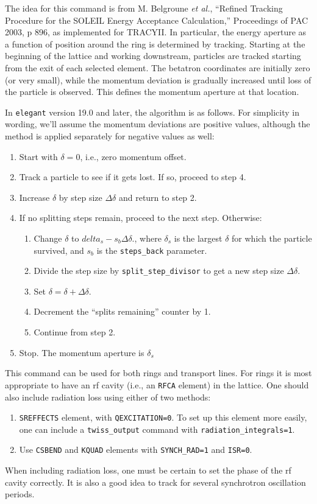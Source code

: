 \documentclass[11pt]{article}
\begin{document}
The idea for this command is from M. Belgroune {\em et al.}, ``Refined
Tracking Procedure for the SOLEIL Energy Acceptance Calculation,''
Proceedings of PAC 2003, p 896, as implemented for TRACYII.  In
particular, the energy aperture as a function of position around the
ring is determined by tracking.  Starting at the beginning of the
lattice and working downstream, particles are tracked starting from
the exit of each selected element.  The betatron coordinates are
initially zero (or very small), while the momentum deviation is
gradually increased until loss of the particle is observed.  This
defines the momentum aperture at that location.

In {\tt elegant} version 19.0 and later, the algorithm is as follows.  For simplicity in
wording, we'll assume the momentum deviations are positive values,
although the method is applied separately for negative values as well:
\begin{enumerate}
\item Start with $\delta=0$, i.e., zero momentum offset.
\item Track a particle to see if it gets lost.  If so, proceed to step 4.
\item Increase $\delta$ by step size $\Delta\delta$ and return to step 2.
\item If no splitting steps remain, proceed to the next step.  Otherwise:
\begin{enumerate}
\item Change $\delta$ to $delta_s - s_b\Delta\delta$., where $\delta_s$ is
 the largest $\delta$ for which the particle survived, and $s_b$ is the
 \verb|steps_back| parameter.
\item Divide the step size by \verb|split_step_divisor| to get a new step size  $\Delta\delta$.
\item Set $\delta = \delta + \Delta\delta$.
\item Decrement the ``splits remaining'' counter by 1.
\item Continue from step 2.
\end{enumerate}
\item Stop.  The momentum aperture is $\delta_s$
\end{enumerate}

This command can be used for both rings and transport lines.  For
rings it is most appropriate to have an rf cavity (i.e., an {\tt RFCA}
element) in the lattice.  One should also include radiation loss using
either of two methods:
\begin{enumerate}
\item {\tt SREFFECTS} element, with {\tt QEXCITATION=0}.  To set up this element more easily, one
 can include a \verb|twiss_output| command with \verb|radiation_integrals=1|.
\item Use {\tt CSBEND} and {\tt KQUAD} elements with \verb|SYNCH_RAD=1| and \verb|ISR=0|.
\end{enumerate}
When including radiation loss, one must be certain to set the phase of the rf cavity
correctly.  It is also a good idea to track for several synchrotron oscillation periods.
\end{document}
